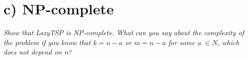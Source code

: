
\section{c) NP-complete}

\textit{Show that LazyTSP is NP-complete. What can you say about the complexity
of the problem if you know that \(k = n - a\) or \(m = n - a\) for some a \(\in N\), which
does not depend on n?}


